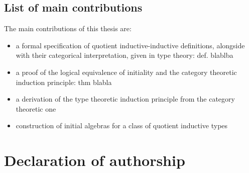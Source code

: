 \subsection{List of main contributions}


The main contributions of this thesis are:

\begin{itemize}
\item a formal specification of quotient inductive-inductive
  definitions, alongside with their categorical interpretation, given
  in type theory: def. blablba
\item a proof of the logical equivalence of initiality and the
  category theoretic induction principle: thm blabla
\item a derivation of the type theoretic induction principle from the
  category theoretic one
\item construction of initial algebras for a class of quotient inductive types
\end{itemize}

\section{Declaration of authorship}

